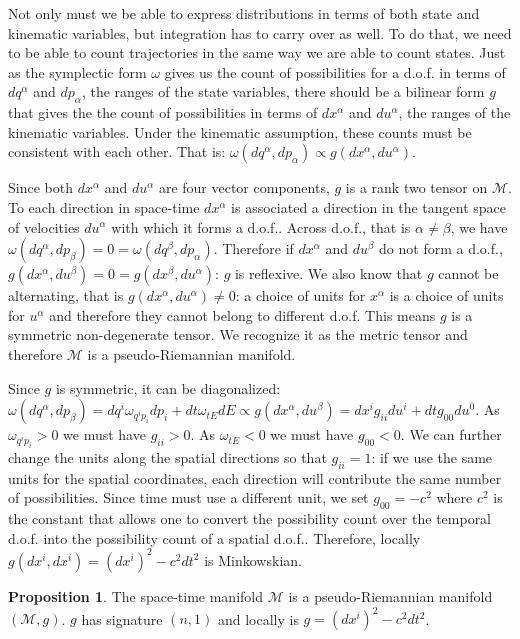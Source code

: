 \documentclass[aps,pra,10pt,twocolumn,floatfix,nofootinbib]{revtex4-1}
\numberwithin{equation}{section}
\theoremstyle{definition}
\newtheorem{prop}[equation]{Proposition}
\begin{document}
Not only must we be able to express distributions in terms of both state and kinematic variables, but integration has to carry over as well. To do that, we need to be able to count trajectories in the same way we are able to count states. Just as the symplectic form $\omega$ gives us the count of possibilities for a d.o.f. in terms of $dq^\alpha$ and $dp_\alpha$, the ranges of the state variables, there should be a bilinear form $g$ that gives the the count of possibilities in terms of $dx^\alpha$ and $du^\alpha$, the ranges of the kinematic variables. Under the kinematic assumption, these counts must be consistent with each other. That is: $\omega(dq^\alpha,dp_\alpha) \propto g(dx^\alpha,du^\alpha)$.

Since both $dx^\alpha$ and $du^\alpha$ are four vector components, $g$ is a rank two tensor on $\mathcal{M}$. To each direction in space-time $dx^\alpha$ is associated a direction in the tangent space of velocities $du^\alpha$ with which it forms a d.o.f.. Across d.o.f., that is $\alpha \neq \beta$, we have $\omega(dq^\alpha, dp_\beta) = 0 =\omega(dq^\beta, dp_\alpha)$. Therefore if $dx^\alpha$ and $du^\beta$ do not form a d.o.f., $g(dx^\alpha, du^\beta) = 0 = g(dx^\beta, du^\alpha)$: $g$ is reflexive. We also know that $g$ cannot be alternating, that is $g(dx^\alpha, du^\alpha) \neq 0$: a choice of units for $x^\alpha$ is a choice of units for $u^\alpha$ and therefore they cannot belong to different d.o.f. This means $g$ is a symmetric non-degenerate tensor. We recognize it as the metric tensor and therefore $\mathcal{M}$ is a pseudo-Riemannian manifold.

Since $g$ is symmetric, it can be diagonalized: $\omega(dq^\alpha, dp_\beta)= dq^i \omega_{q^ip_i} dp_i + dt \omega_{tE} dE \propto g(dx^\alpha, du^\beta) = dx^i g_{ii} du^i + dt g_{00} du^0$. As $\omega_{q^ip_i} > 0$ we must have $g_{ii} > 0$. As $\omega_{tE} < 0$ we must have $g_{00} < 0$. We can further change the units along the spatial directions so that $g_{ii}=1$: if we use the same units for the spatial coordinates, each direction will contribute the same number of possibilities. Since time must use a different unit, we set $g_{00}=-c^2$ where $c^2$ is the constant that allows one to convert the possibility count over the temporal d.o.f. into the possibility count of a spatial d.o.f.. Therefore, locally $g(dx^i, dx^i) = (dx^i)^2 - c^2 dt^2$ is Minkowskian.

\begin{prop}\label{prop:riemannian_manifold}
	The space-time manifold $\mathcal{M}$ is a pseudo-Riemannian manifold $(\mathcal{M}, g)$. $g$ has signature $(n,1)$ and locally is $g = (dx^i)^2 - c^2 dt^2$.
\end{prop}
\end{document}
